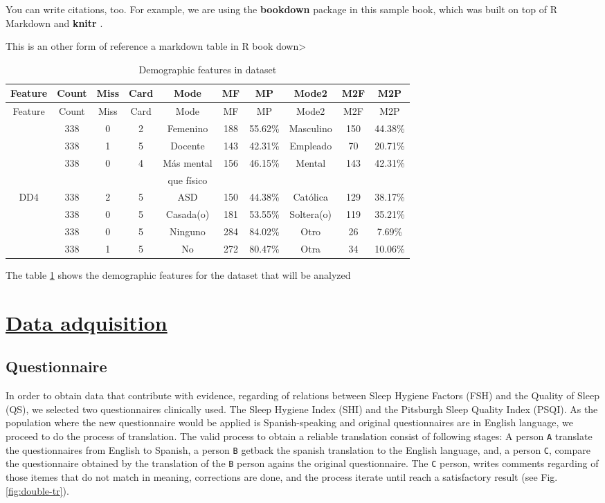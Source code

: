 \documentclass[]{book}
\begin{document}
You can write citations, too. For example, we are using the
\textbf{bookdown} package \citep{R-bookdown} in this sample book, which
was built on top of R Markdown and \textbf{knitr} \citep{xie2015}.

This is an other form of reference a markdown table in R book
down\textgreater{}

\begin{longtable}[]{@{}cccccccccc@{}}
\caption{\label{tab:demographic-features} Demographic features in
dataset}\tabularnewline
\toprule
Feature & Count & Miss & Card & Mode & MF & MP & Mode2 & M2F &
M2P\tabularnewline
\midrule
\endfirsthead
\toprule
Feature & Count & Miss & Card & Mode & MF & MP & Mode2 & M2F &
M2P\tabularnewline
\midrule
\endhead
& 338 & 0 & 2 & Femenino & 188 & 55.62\% & Masculino & 150 &
44.38\%\tabularnewline
& 338 & 1 & 5 & Docente & 143 & 42.31\% & Empleado & 70 &
20.71\%\tabularnewline
& 338 & 0 & 4 & Más mental & 156 & 46.15\% & Mental & 143 &
42.31\%\tabularnewline
& & & & que físico & & & & &\tabularnewline
DD4 & 338 & 2 & 5 & ASD & 150 & 44.38\% & Católica & 129 &
38.17\%\tabularnewline
& 338 & 0 & 5 & Casada(o) & 181 & 53.55\% & Soltera(o) & 119 &
35.21\%\tabularnewline
& 338 & 0 & 5 & Ninguno & 284 & 84.02\% & Otro & 26 &
7.69\%\tabularnewline
& 338 & 1 & 5 & No & 272 & 80.47\% & Otra & 34 & 10.06\%\tabularnewline
\bottomrule
\end{longtable}

The table \ref{tab:demographic-features} shows the demographic features
for the dataset that will be analyzed

\hypertarget{data-adquisition}{\chapter{\texorpdfstring{\protect\hyperlink{data-adquisition}{Data
adquisition}}{Data adquisition}}\label{data-adquisition}}

\section{Questionnaire}\label{questionnaire}

In order to obtain data that contribute with evidence, regarding of
relations between Sleep Hygiene Factors (FSH) and the Quality of Sleep
(QS), we selected two questionnaires clinically used. The Sleep Hygiene
Index (SHI) and the Pitsburgh Sleep Quality Index (PSQI). As the
population where the new questionnaire would be applied is
Spanish-speaking and original questionnaires are in English language, we
proceed to do the process of translation. The valid process to obtain a
reliable translation consist of following stages: A person \texttt{A}
translate the questionnaires from English to Spanish, a person
\texttt{B} getback the spanish translation to the English language, and,
a person \texttt{C}, compare the questionnaire obtained by the
translation of the \texttt{B} person agains the original questionnaire.
The \texttt{C} person, writes comments regarding of those itemes that do
not match in meaning, corrections are done, and the process iterate
until reach a satisfactory result (see Fig. \ref{fig:double-tr}).
\end{document}
